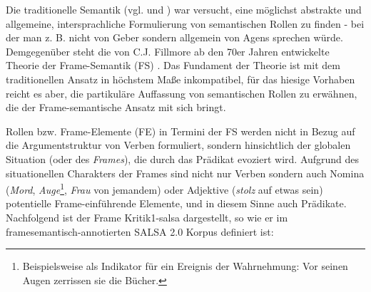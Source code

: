 \documentclass[12pt]{article}
\begin{document}
Die traditionelle Semantik (vgl. \cite{fillmore_case_1968} und \cite{jackendoff_semantics_1985}) war versucht, eine möglichst abstrakte und
allgemeine, intersprachliche Formulierung von semantischen Rollen zu
finden - bei der man z. B. nicht von \glqq{}Geber\grqq{} sondern allgemein
von \glqq{}Agens\grqq{} sprechen würde. Demgegenüber steht die von C.J. Fillmore
ab den 70er Jahren entwickelte Theorie der Frame-Semantik (FS)
\citep{fillmore1985}. Das Fundament der Theorie ist mit dem traditionellen
Ansatz in höchstem Maße inkompatibel, für das hiesige Vorhaben reicht es aber, die
partikuläre Auffassung von semantischen Rollen zu erwähnen, die der
Frame-semantische Ansatz mit sich bringt.

Rollen bzw. Frame-Elemente (FE) in Termini der FS werden nicht in Bezug auf die
Argumentstruktur von Verben formuliert, sondern hinsichtlich der globalen
Situation (oder des \textit{Frames}), die durch das Prädikat evoziert wird. Aufgrund
des situationellen Charakters der Frames sind nicht nur Verben sondern auch
Nomina (\textit{Mord}, \textit{Auge}\footnote{Beispielsweise als Indikator für ein Ereignis der Wahrnehmung: \glqq{}Vor seinen Augen zerrissen sie die Bücher.\grqq{}}, \textit{Frau} von jemandem) oder Adjektive (\textit{stolz} auf etwas sein) potentielle
Frame-einführende Elemente, und in diesem Sinne auch Prädikate. Nachfolgend ist der Frame \glqq{}Kritik1-salsa\grqq{} dargestellt, so wie er im framesemantisch-annotierten SALSA 2.0 Korpus \citep{rehbein_adding_2012} definiert ist:
\end{document}
